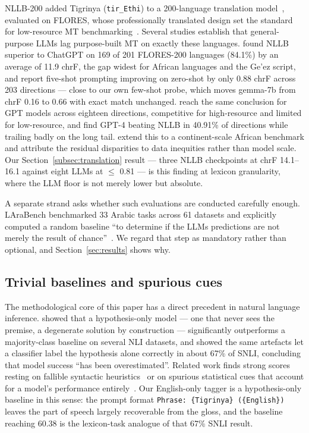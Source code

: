 \documentclass[11pt]{article}
\begin{document}
NLLB-200 added Tigrinya (\texttt{tir\_Ethi}) to a 200-language translation
model~\citep{nllb-2022}, evaluated on FLORES, whose professionally
translated design set the standard for low-resource MT
benchmarking~\citep{goyal-etal-2022-flores}. Several studies establish that
general-purpose LLMs lag purpose-built MT on exactly these languages.
\citet{robinson-etal-2023-chatgpt} found NLLB superior to ChatGPT on 169 of
201 FLORES-200 languages (84.1\%) by an average of 11.9 chrF, the gap widest
for African languages and the Ge'ez script, and report five-shot prompting
improving on zero-shot by only 0.88 chrF across 203 directions --- close to
our own few-shot probe, which moves gemma-7b from chrF 0.16 to 0.66 with
exact match unchanged. \citet{hendy-etal-2023-gpt} reach the same conclusion
for GPT models across eighteen directions, competitive for high-resource and
limited for low-resource, and \citet{zhu-etal-2023-multilingual} find GPT-4
beating NLLB in 40.91\% of directions while trailing badly on the long tail.
\citet{adebara-etal-2025-where} extend this to a continent-scale African
benchmark and attribute the residual disparities to data inequities rather
than model scale. Our Section~\ref{subsec:translation} result --- three NLLB
checkpoints at chrF 14.1--16.1 against eight LLMs at $\leq$ 0.81 --- is this
finding at lexicon granularity, where the LLM floor is not merely lower but
absolute.

A separate strand asks whether such evaluations are conducted carefully
enough. LAraBench benchmarked 33 Arabic tasks across 61 datasets and
explicitly computed a random baseline ``to determine if the LLMs predictions
are not merely the result of chance''~\citep{abdelali-etal-2023-larabench}.
We regard that step as mandatory rather than optional, and
Section~\ref{sec:results} shows why.

\subsection{Trivial baselines and spurious cues}
\label{subsec:spurious}

The methodological core of this paper has a direct precedent in natural
language inference. \citet{poliak-etal-2018-hypothesis} showed that a
hypothesis-only model --- one that never sees the premise, a degenerate
solution by construction --- significantly outperforms a majority-class
baseline on several NLI datasets, and
\citet{gururangan-etal-2018-annotation} showed the same artefacts let a
classifier label the hypothesis alone correctly in about 67\% of SNLI,
concluding that model success ``has been overestimated''. Related work finds
strong scores resting on fallible syntactic
heuristics~\citep{mccoy-etal-2019-right} or on spurious statistical cues
that account for a model's performance
entirely~\citep{niven-kao-2019-probing}. Our English-only tagger is a
hypothesis-only baseline in this sense: the prompt format \texttt{Phrase:
\{Tigrinya\} (\{English\})} leaves the part of speech largely recoverable
from the gloss, and the baseline reaching 60.38 is the lexicon-task analogue
of that 67\% SNLI result.
\end{document}
